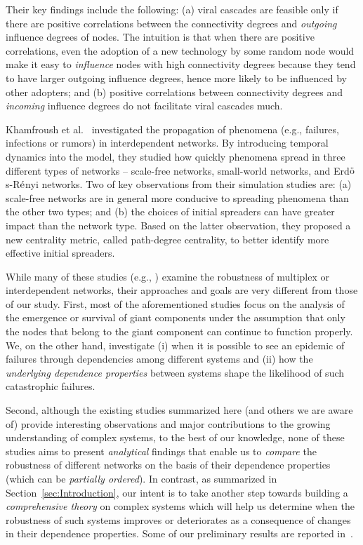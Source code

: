 \documentclass[10pt, journal, compsoc]{IEEEtran}
\newcommand{\ER}{Erd$\ddot{\rm o}$s-R$\acute{\rm e}$nyi }
\begin{document}
Their key findings include the following: 
(a) viral cascades are feasible only if there 
are positive correlations between the connectivity 
degrees and {\em outgoing} 
influence degrees of nodes. The intuition is that
when there are positive correlations, even the
adoption of a new technology by some random node
would make it easy to {\em influence} nodes
with high connectivity degrees because they
tend to have larger outgoing influence degrees, 
hence more likely to be influenced by other 
adopters; and (b) positive correlations between 
connectivity degrees and {\em incoming} influence 
degrees do not facilitate viral cascades much. 

Khamfroush et al.~\cite{Kham2016} investigated
the propagation of phenomena (e.g., failures, 
infections or rumors) in interdependent 
networks. By introducing temporal dynamics
into the model, they studied how quickly 
phenomena spread in three different types
of networks -- scale-free networks,
small-world networks, and  
\ER networks. Two of key observations
from their simulation studies
are: (a) scale-free networks are in general more
conducive to spreading phenomena than 
the other two types; and (b) the choices
of initial spreaders can have greater impact
than the network type. Based on the latter
observation, they proposed a new centrality
metric, called path-degree centrality, 
to better identify more effective initial
spreaders. 


While many of these studies 
(e.g., \cite{Buldyrev2010, Huang2011, Parshani2010, 
Shao2011}) examine the robustness 
of multiplex or interdependent networks, 
their approaches and goals are very different
from those of our study. First, most of the
aforementioned studies focus on the analysis
of the emergence or survival of giant 
components under the assumption that only
the nodes that belong to the giant component
can continue to function properly. We, on the
other hand, investigate (i) when it is
possible to see an epidemic of failures through
dependencies among different systems 
and (ii) how the
{\em underlying dependence properties} between 
systems shape the likelihood of such catastrophic 
failures. 

Second, 
although the existing studies summarized here 
(and others we are aware of) provide interesting 
observations and major contributions to the growing 
understanding of complex systems, to the best of 
our knowledge, none of these studies aims to present 
{\em analytical} findings that enable us 
to {\em compare} the robustness of different 
networks on the basis of their dependence 
properties (which can be {\em partially ordered}). 
In contrast, as summarized in 
Section~\ref{sec:Introduction}, our intent is to
take another step towards building a {\em 
comprehensive theory} on complex systems 
which will help us determine when the robustness
of such systems improves or deteriorates as a
consequence of changes in their dependence 
properties. Some of our preliminary
results are reported in~\cite{La_CISS}. 
\end{document}
